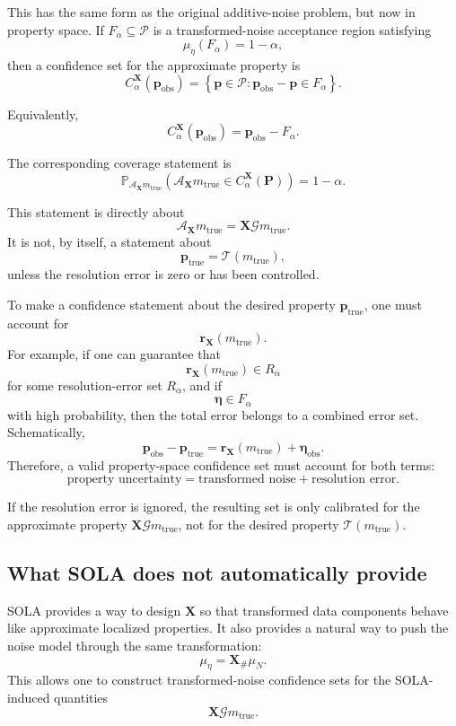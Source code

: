\documentclass[11pt]{article}
\newcommand{\Pspace}{\mathcal P}
\newcommand{\muN}{\mu_N}
\newcommand{\Prand}{\mathbf P}
\newcommand{\ptrue}{\mathbf p_{\mathrm{true}}}
\newcommand{\pobs}{\mathbf p_{\mathrm{obs}}}
\newcommand{\G}{\mathcal G}
\newcommand{\Tau}{\mathcal T}
\newcommand{\X}{\mathbf X}
\newcommand{\A}{\mathcal A}
\newcommand{\Prob}{\mathbb P}
\newcommand{\etarand}{\boldsymbol{\eta}}
\newcommand{\mueta}{\mu_{\eta}}
\begin{document}
This has the same form as the original additive-noise problem, but now in property space. If \(F_{\alpha}\subseteq\Pspace\) is a transformed-noise acceptance region satisfying
\[
    \mueta(F_{\alpha})=1-\alpha,
\]
then a confidence set for the approximate property is
\[
    C_{\alpha}^{\X}(\pobs)
    =
    \left\{
        \mathbf p\in\Pspace:
        \pobs-\mathbf p\in F_{\alpha}
    \right\}.
\]

Equivalently,
\[
    C_{\alpha}^{\X}(\pobs)
    =
    \pobs-F_{\alpha}.
\]

The corresponding coverage statement is
\[
    \Prob_{\A_{\X}m_{\mathrm{true}}}
    \left(
        \A_{\X}m_{\mathrm{true}}
        \in
        C_{\alpha}^{\X}(\Prand)
    \right)
    =
    1-\alpha.
\]

This statement is directly about
\[
    \A_{\X}m_{\mathrm{true}}
    =
    \X\G m_{\mathrm{true}}.
\]
It is not, by itself, a statement about
\[
    \ptrue=\Tau(m_{\mathrm{true}}),
\]
unless the resolution error is zero or has been controlled.

To make a confidence statement about the desired property \(\ptrue\), one must account for
\[
    \mathbf r_{\X}(m_{\mathrm{true}}).
\]
For example, if one can guarantee that
\[
    \mathbf r_{\X}(m_{\mathrm{true}})\in R_{\alpha}
\]
for some resolution-error set \(R_{\alpha}\), and if
\[
    \etarand\in F_{\alpha}
\]
with high probability, then the total error belongs to a combined error set. Schematically,
\[
    \pobs-\ptrue
    =
    \mathbf r_{\X}(m_{\mathrm{true}})
    +
    \etarand_{\mathrm{obs}}.
\]
Therefore, a valid property-space confidence set must account for both terms:
\[
    \text{property uncertainty}
    =
    \text{transformed noise}
    +
    \text{resolution error}.
\]

If the resolution error is ignored, the resulting set is only calibrated for the approximate property \(\X\G m_{\mathrm{true}}\), not for the desired property \(\Tau(m_{\mathrm{true}})\).

\subsection{What SOLA does not automatically provide}

SOLA provides a way to design \(\X\) so that transformed data components behave like approximate localized properties. It also provides a natural way to push the noise model through the same transformation:
\[
    \mueta
    =
    \X_{\#}\muN.
\]
This allows one to construct transformed-noise confidence sets for the SOLA-induced quantities
\[
    \X\G m_{\mathrm{true}}.
\]
\end{document}
